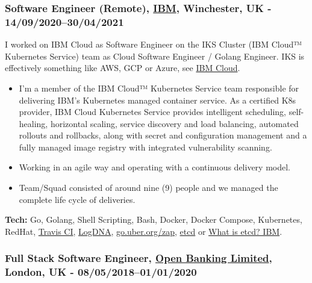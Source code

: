 \documentclass[
  a4paper,
]{article}
\providecommand{\tightlist}{%
  \setlength{\itemsep}{0pt}\setlength{\parskip}{0pt}}
\begin{document}
\begin{multicols*}{2}
\hypertarget{software-engineer-remote-ibm-winchester-uk---1409202030042021}{%
\subsubsection{\texorpdfstring{Software Engineer (Remote),
\href{https://www.ibm.com/uk/en/}{IBM}, Winchester, UK -
14/09/2020--30/04/2021}{Software Engineer (Remote), IBM, Winchester, UK - 14/09/2020--30/04/2021}}\label{software-engineer-remote-ibm-winchester-uk---1409202030042021}}

I worked on IBM Cloud as Software Engineer on the IKS Cluster (IBM
Cloud™ Kubernetes Service) team as Cloud Software Engineer / Golang
Engineer. IKS is effectively something like AWS, GCP or Azure, see
\href{https://cloud.ibm.com/}{IBM Cloud}.

\begin{itemize}
\tightlist
\item
  I'm a member of the IBM Cloud™ Kubernetes Service team responsible for
  delivering IBM's Kubernetes managed container service. As a certified
  K8s provider, IBM Cloud Kubernetes Service provides intelligent
  scheduling, self-healing, horizontal scaling, service discovery and
  load balancing, automated rollouts and rollbacks, along with secret
  and configuration management and a fully managed image registry with
  integrated vulnerability scanning.
\item
  Working in an agile way and operating with a continuous delivery
  model.
\item
  Team/Squad consisted of around nine (9) people and we managed the
  complete life cycle of deliveries.
\end{itemize}

\textbf{Tech:} Go, Golang, Shell Scripting, Bash, Docker, Docker
Compose, Kubernetes, RedHat, \href{https://travis-ci.org/}{Travis CI},
\href{https://logdna.com/}{LogDNA},
\href{https://github.com/uber-go/zap}{go.uber.org/zap},
\href{https://etcd.io/}{etcd} or
\href{https://www.ibm.com/cloud/learn/etcd}{What is etcd? \textbar{}
IBM}.

\hypertarget{full-stack-software-engineer-open-banking-limited-london-uk---0805201801012020}{%
\subsubsection{\texorpdfstring{Full Stack Software Engineer,
\href{https://www.openbanking.org.uk}{Open Banking Limited}, London, UK
-
08/05/2018--01/01/2020}{Full Stack Software Engineer, Open Banking Limited, London, UK - 08/05/2018--01/01/2020}}\label{full-stack-software-engineer-open-banking-limited-london-uk---0805201801012020}}


\end{multicols*}
\end{document}

